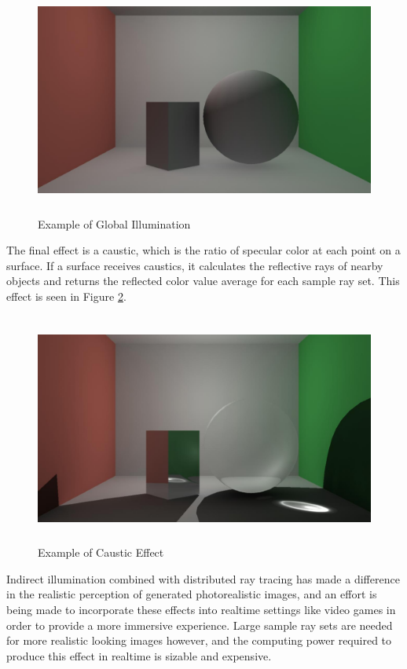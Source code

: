 \begin{figure}[h]
\centering
\includegraphics[height=3.0in]{figures/globalIll.jpg}
\caption{Example of Global Illumination}
\label{fig:globalill}
\end{figure}

The final effect is a caustic, which is the ratio of specular color at each point on a surface.  If a surface receives caustics, it calculates the reflective rays of nearby objects and returns the reflected color value average for each sample ray set.  This effect is seen in Figure \ref{fig:caustics}.
\begin{figure}[h]
\centering
\includegraphics[height=3.0in]{figures/caustics.jpg}
\caption{Example of Caustic Effect}
\label{fig:caustics}
\end{figure}

Indirect illumination combined with distributed ray tracing has made a difference in the realistic perception of generated photorealistic images, and an effort is being made to incorporate these effects into realtime settings like video games in order to provide a more immersive experience.  Large sample ray sets are needed for more realistic looking images however, and the computing power required to produce this effect in realtime is sizable and expensive.

